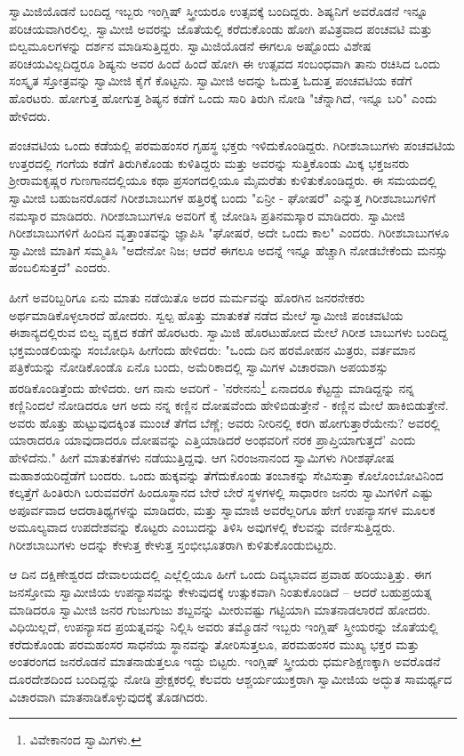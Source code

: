 ಸ್ವಾಮಿಜಿಯೊಡನೆ ಬಂದಿದ್ದ ಇಬ್ಬರು ಇಂಗ್ಲಿಷ್ ಸ್ತ್ರೀಯರೂ ಉತ್ಸವಕ್ಕೆ ಬಂದಿದ್ದರು. ಶಿಷ್ಯನಿಗೆ ಅವರೊಡನೆ ಇನ್ನೂ ಪರಿಚಯವಾಗಿರಲಿಲ್ಲ. ಸ್ವಾಮೀಜಿ ಅವರನ್ನು ಜೊತೆಯಲ್ಲಿ ಕರೆದುಕೊಂಡು ಹೋಗಿ ಪವಿತ್ರವಾದ ಪಂಚವಟಿ ಮತ್ತು ಬಿಲ್ವಮೂಲಗಳನ್ನು ದರ್ಶನ ಮಾಡಿಸುತ್ತಿದ್ದರು. ಸ್ವಾಮಿಜಿಯೊಡನೆ ಈಗಲೂ ಅಷ್ಟೊಂದು ವಿಶೇಷ ಪರಿಚಯವಿಲ್ಲದಿದ್ದರೂ ಶಿಷ್ಯನು ಅವರ ಹಿಂದೆ ಹಿಂದೆ ಹೋಗಿ ಈ ಉತ್ಸವದ ಸಂಬಂಧವಾಗಿ ತಾನು ರಚಿಸಿದ ಒಂದು ಸಂಸ್ಕೃತ ಸ್ತೋತ್ರವನ್ನು ಸ್ವಾಮೀಜಿ ಕೈಗೆ ಕೊಟ್ಟನು. ಸ್ವಾಮೀಜಿ ಅದನ್ನು ಓದುತ್ತ ಓದುತ್ತ ಪಂಚವಟಿಯ ಕಡೆಗೆ ಹೊರಟರು. ಹೋಗುತ್ತ ಹೋಗುತ್ತ ಶಿಷ್ಯನ ಕಡೆಗೆ ಒಂದು ಸಾರಿ ತಿರುಗಿ ನೋಡಿ "ಚೆನ್ನಾಗಿದೆ, ಇನ್ನೂ ಬರಿ" ಎಂದು ಹೇಳಿದರು.

ಪಂಚವಟಿಯ ಒಂದು ಕಡೆಯಲ್ಲಿ ಪರಮಹಂಸರ ಗೃಹಸ್ಥ ಭಕ್ತರು ಇಳಿದುಕೊಂಡಿದ್ದರು. ಗಿರೀಶಬಾಬುಗಳು ಪಂಚವಟಿಯ ಉತ್ತರದಲ್ಲಿ ಗಂಗೆಯ ಕಡೆಗೆ ತಿರುಗಿಕೊಂಡು ಕುಳಿತಿದ್ದರು ಮತ್ತು ಅವರನ್ನು ಸುತ್ತಿಕೊಂಡು ಮಿಕ್ಕ ಭಕ್ತಜನರು ಶ‍್ರೀರಾಮಕೃಷ್ಣರ ಗುಣಗಾನದಲ್ಲಿಯೂ ಕಥಾ ಪ್ರಸಂಗದಲ್ಲಿಯೂ ಮೈಮರೆತು ಕುಳಿತುಕೊಂಡಿದ್ದರು. ಈ ಸಮಯದಲ್ಲಿ ಸ್ವಾಮೀಜಿ ಬಹುಜನರೊಡನೆ ಗಿರೀಶಬಾಬುಗಳ ಹತ್ತಿರಕ್ಕೆ ಬಂದು "ಏನ್ರೀ - ಘೋಷರೆ" ಎನ್ನುತ್ತ ಗಿರೀಶಬಾಬುಗಳಿಗೆ ನಮಸ್ಕಾರ ಮಾಡಿದರು. ಗಿರೀಶಬಾಬುಗಳೂ ಅವರಿಗೆ ಕೈ ಜೋಡಿಸಿ ಪ್ರತಿನಮಸ್ಕಾರ ಮಾಡಿದರು. ಸ್ವಾಮೀಜಿ ಗಿರೀಶಬಾಬುಗಳಿಗೆ ಹಿಂದಿನ ವೃತ್ತಾಂತವನ್ನು ಜ್ಞಾಪಿಸಿ "ಘೋಷರೆ, ಅದೇ ಒಂದು ಕಾಲ" ಎಂದರು. ಗಿರೀಶಬಾಬುಗಳೂ ಸ್ವಾಮೀಜಿ ಮಾತಿಗೆ ಸಮ್ಮತಿಸಿ "ಅದೇನೋ ನಿಜ; ಆದರೆ ಈಗಲೂ ಅದನ್ನೆ ಇನ್ನೂ ಹೆಚ್ಚಾಗಿ ನೋಡಬೇಕೆಂದು ಮನಸ್ಸು ಹಂಬಲಿಸುತ್ತದೆ" ಎಂದರು.

ಹೀಗೆ ಅವರಿಬ್ಬರಿಗೂ ಏನು ಮಾತು ನಡೆಯಿತೊ ಅದರ ಮರ್ಮವನ್ನು ಹೊರಗಿನ ಜನರನೇಕರು ಅರ್ಥಮಾಡಿಕೊಳ್ಳಲಾರದೆ ಹೋದರು. ಸ್ವಲ್ಪ ಹೊತ್ತು ಮಾತುಕತೆ ನಡೆದ ಮೇಲೆ ಸ್ವಾಮೀಜಿ ಪಂಚವಟಿಯ ಈಶಾನ್ಯದಲ್ಲಿರುವ ಬಿಲ್ವ ವೃಕ್ಷದ ಕಡೆಗೆ ಹೊರಟರು. ಸ್ವಾಮಿಜಿ ಹೊರಟುಹೋದ ಮೇಲೆ ಗಿರೀಶ ಬಾಬುಗಳು ಬಂದಿದ್ದ ಭಕ್ತಮಂಡಲಿಯನ್ನು ಸಂಬೋಧಿಸಿ ಹೀಗೆಂದು ಹೇಳಿದರು: "ಒಂದು ದಿನ ಹರಮೋಹನ ಮಿತ್ರರು, ವರ್ತಮಾನ ಪತ್ರಿಕೆಯನ್ನು ನೋಡಿಕೊಂಡೊ ಏನೊ ಬಂದು, ಅಮೆರಿಕಾದಲ್ಲಿ ಸ್ವಾಮಿಗಳ ವಿಚಾರವಾಗಿ ಅಪಯಶಸ್ಸು ಹರಡಿಕೊಂಡಿತ್ತೆಂದು ಹೇಳಿದರು. ಆಗ ನಾನು ಅವರಿಗೆ - 'ನರೇನನು\footnote{ವಿವೇಕಾನಂದ ಸ್ವಾಮಿಗಳು.} ಏನಾದರೂ ಕೆಟ್ಟದ್ದು ಮಾಡಿದ್ದನ್ನು ನನ್ನ ಕಣ್ಣಿನಿಂದಲೆ ನೋಡಿದರೂ ಆಗ ಅದು ನನ್ನ ಕಣ್ಣಿನ ದೋಷವೆಂದು ಹೇಳಿಬಿಡುತ್ತೇನೆ - ಕಣ್ಣಿನ ಮೇಲೆ ಹಾಕಿಬಿಡುತ್ತೇನೆ. ಅವರು ಹೊತ್ತು ಹುಟ್ಟುವುದಕ್ಕಿಂತ ಮುಂಚೆ ತೆಗೆದ ಬೆಣ್ಣೆ; ಅವರು ನೀರಿನಲ್ಲಿ ಕರಗಿ ಹೋಗುತ್ತಾರೆಯೇನು? ಅವರಲ್ಲಿ ಯಾರಾದರೂ ಯಾವುದಾದರೂ ದೋಷವನ್ನು ಎತ್ತಿಯಾಡಿದರೆ ಅಂಥವರಿಗೆ ನರಕ ಪ್ರಾಪ್ತಿಯಾಗುತ್ತದೆ' ಎಂದು ಹೇಳಿದೆನು." ಹೀಗೆ ಮಾತುಕತೆಗಳು ನಡೆಯುತ್ತಿದ್ದವು. ಆಗ ನಿರಂಜನಾನಂದ ಸ್ವಾಮಿಗಳು ಗಿರೀಶಘೋಷ ಮಹಾಶಯರಿದ್ದೆಡೆಗೆ ಬಂದರು. ಒಂದು ಹುಕ್ಕವನ್ನು ತೆಗೆದುಕೊಂಡು ತಂಬಾಕನ್ನು ಸೇವಿಸುತ್ತಾ ಕೊಲೊಂಬೋವಿನಿಂದ ಕಲ್ಕತ್ತೆಗೆ ಹಿಂತಿರುಗಿ ಬರುವವರೆಗೆ ಹಿಂದೂಸ್ಥಾನದ ಬೇರೆ ಬೇರೆ ಸ್ಥಳಗಳಲ್ಲಿ ಸಾಧಾರಣ ಜನರು ಸ್ವಾಮಿಗಳಿಗೆ ಎಷ್ಟು ಅಪೂರ್ವವಾದ ಆದರಾತಿಥ್ಯಗಳನ್ನು ಮಾಡಿದರು, ಮತ್ತು ಸ್ವಾಮಾಜಿ ಅವರೆಲ್ಲರಿಗೂ ಹೇಗೆ ಉಪನ್ಯಾಸಗಳ ಮೂಲಕ ಅಮೂಲ್ಯವಾದ ಉಪದೇಶವನ್ನು ಕೊಟ್ಟರು ಎಂಬುದನ್ನು ತಿಳಿಸಿ ಅವುಗಳಲ್ಲಿ ಕೆಲವನ್ನು ವರ್ಣಿಸುತ್ತಿದ್ದರು. ಗಿರೀಶಬಾಬುಗಳು ಅದನ್ನು ಕೇಳುತ್ತ ಕೇಳುತ್ತ ಸ್ತಂಭೀಭೂತರಾಗಿ ಕುಳಿತುಕೊಂಡುಬಿಟ್ಟರು.

ಆ ದಿನ ದಕ್ಷಿಣೇಶ್ವರದ ದೇವಾಲಯದಲ್ಲಿ ಎಲ್ಲೆಲ್ಲಿಯೂ ಹೀಗೆ ಒಂದು ದಿವ್ಯಭಾವದ ಪ್ರವಾಹ ಹರಿಯುತ್ತಿತ್ತು. ಈಗ ಜನಸ್ತೋಮ ಸ್ವಾಮೀಜಿಯ ಉಪನ್ಯಾಸವನ್ನು ಕೇಳುವುದಕ್ಕೆ ಉತ್ಸುಕವಾಗಿ ನಿಂತುಕೊಂಡಿದೆ – ಆದರೆ ಬಹುಪ್ರಯತ್ನ ಮಾಡಿದರೂ ಸ್ವಾಮೀಜಿ ಜನರ ಗುಜುಗುಜು ಶಬ್ದವನ್ನು ಮೀರುವಷ್ಟು ಗಟ್ಟಿಯಾಗಿ ಮಾತನಾಡಲಾರದೆ ಹೋದರು. ವಿಧಿಯಿಲ್ಲದೆ, ಉಪನ್ಯಾಸದ ಪ್ರಯತ್ನವನ್ನು ನಿಲ್ಲಿಸಿ ಅವರು ತಮ್ಮೊಡನೆ ಇಬ್ಬರು ಇಂಗ್ಲಿಷ್ ಸ್ತ್ರೀಯರನ್ನು ಜೊತೆಯಲ್ಲಿ ಕರೆದುಕೊಂಡು ಪರಮಹಂಸರ ಸಾಧನೆಯ ಸ್ಥಾನವನ್ನು ತೋರಿಸುತ್ತಲೂ, ಪರಮಹಂಸರ ಮುಖ್ಯ ಭಕ್ತರ ಮತ್ತು ಅಂತರಂಗದ ಜನರೊಡನೆ ಮಾತನಾಡುತ್ತಲೂ ಇದ್ದು ಬಿಟ್ಟರು. ಇಂಗ್ಲಿಷ್ ಸ್ತ್ರೀಯರು ಧರ್ಮಶಿಕ್ಷಣಕ್ಕಾಗಿ ಅವರೊಡನೆ ದೂರದೇಶದಿಂದ ಬಂದಿದ್ದನ್ನು ನೋಡಿ ಪ್ರೇಕ್ಷಕರಲ್ಲಿ ಕೆಲವರು ಆಶ್ಚರ್ಯಯುಕ್ತರಾಗಿ ಸ್ವಾಮೀಜಿಯ ಅದ್ಭುತ ಸಾಮರ್ಥ್ಯದ ವಿಚಾರವಾಗಿ ಮಾತನಾಡಿಕೊಳ್ಳುವುದಕ್ಕೆ ತೊಡಗಿದರು.

